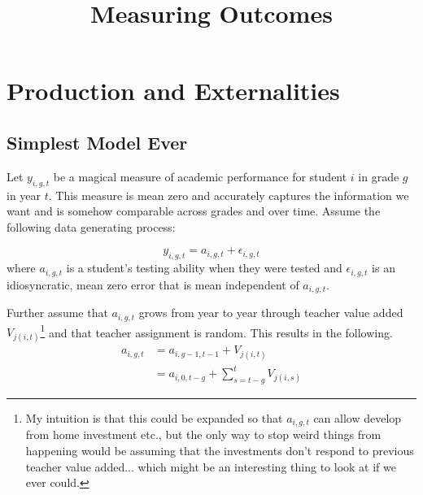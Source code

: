\documentclass{article}
\title{Measuring Outcomes}
\theoremstyle{definition}
\theoremstyle{definition}
\begin{document}


\section{Production and Externalities}
\subsection{Simplest Model Ever}

Let $y_{i,g,t}$ be a magical measure of academic performance for student $i$ in grade $g$ in year $t$. This measure is mean zero and accurately captures the information we want and is somehow comparable across grades and over time. Assume the following data generating process:

\[
y_{i,g,t}  = a_{i,g,t} + \epsilon_{i,g,t}
\]
\noindent where $a_{i,g,t}$ is a student's testing ability when they were tested and $\epsilon_{i,g,t}$ is an idiosyncratic, mean zero error that is mean independent of $a_{i,g,t}$.

Further assume that $a_{i,g,t}$ grows from year to year through teacher value added $V_{j(i,t)}$\footnote{My intuition is that this could be expanded so that $a_{i,g,t}$ can allow develop from home investment etc., but the only way to stop weird things from happening would be assuming that the investments don't respond to previous teacher value added... which might be an interesting thing to look at if we ever could.} and that teacher assignment is random. This results in the following. 
\begin{align*}
    a_{i,g,t} &= a_{i,g-1,t-1} + V_{j(i,t)} \\
              &= a_{i,0,t-g} + \sum_{s=t-g}^t  V_{j(i,s)} 
\end{align*}
\end{document}
